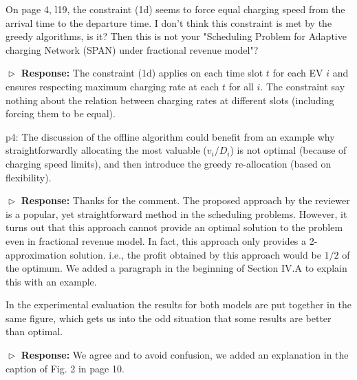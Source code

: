 \documentclass[11pt]{article}
\begin{document}
\vspace{3mm}
{\color{blue} On page 4, l19, the constraint (1d) seems to force equal charging speed from the arrival time to the departure time. I don't think this constraint is met by the greedy algorithms, is it? Then this is not your "Scheduling Problem for Adaptive charging Network (SPAN) under fractional revenue model"? }
\vspace{3mm}

$\vartriangleright$ \noindent\textbf{Response:} 
The constraint (1d) applies on each time slot $t$ for each EV $i$ and ensures respecting maximum charging rate at each $t$ for all $i$. The constraint say nothing about the relation between charging rates at different slots (including forcing them to be equal).

\vspace{3mm}
{\color{blue} p4: The discussion of the offline algorithm could benefit from an example why straightforwardly allocating the most valuable ($v_i/D_i$) is not optimal (because of charging speed limits), and then introduce the greedy re-allocation (based on flexibility). }
\vspace{3mm}

$\vartriangleright$ \noindent\textbf{Response:} 
Thanks for the comment.  
The proposed approach by the reviewer is a popular, yet straightforward method in the scheduling problems. However, it turns out that this approach cannot provide an optimal solution to the problem even in fractional revenue model. In fact, this approach only provides a 2-approximation solution. i.e., the profit obtained by this approach would be $1/2$ of the optimum. We added a paragraph in the beginning of Section IV.A to explain this with an example. 

\vspace{3mm}
{\color{blue} In the experimental evaluation the results for both models are put together in the same figure, which gets us into the odd situation that some results are better than optimal.
 }
\vspace{3mm}

$\vartriangleright$ \noindent\textbf{Response:} 
We agree and to avoid confusion, we added an explanation in the caption of Fig. 2 in page 10. 
\end{document}
